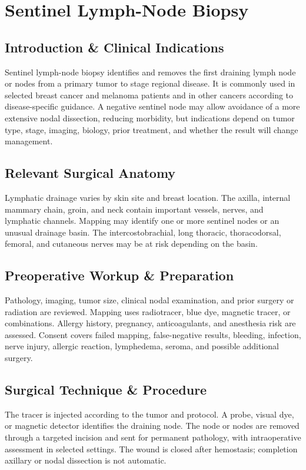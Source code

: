 \chapter{Sentinel Lymph-Node Biopsy}

\section*{Introduction \& Clinical Indications}
Sentinel lymph-node biopsy identifies and removes the first draining lymph node or nodes from a primary tumor to stage regional disease. It is commonly used in selected breast cancer and melanoma patients and in other cancers according to disease-specific guidance. A negative sentinel node may allow avoidance of a more extensive nodal dissection, reducing morbidity, but indications depend on tumor type, stage, imaging, biology, prior treatment, and whether the result will change management.

\section*{Relevant Surgical Anatomy}
Lymphatic drainage varies by skin site and breast location. The axilla, internal mammary chain, groin, and neck contain important vessels, nerves, and lymphatic channels. Mapping may identify one or more sentinel nodes or an unusual drainage basin. The intercostobrachial, long thoracic, thoracodorsal, femoral, and cutaneous nerves may be at risk depending on the basin.

\section*{Preoperative Workup \& Preparation}
Pathology, imaging, tumor size, clinical nodal examination, and prior surgery or radiation are reviewed. Mapping uses radiotracer, blue dye, magnetic tracer, or combinations. Allergy history, pregnancy, anticoagulants, and anesthesia risk are assessed. Consent covers failed mapping, false-negative results, bleeding, infection, nerve injury, allergic reaction, lymphedema, seroma, and possible additional surgery.

\section*{Surgical Technique \& Procedure}
The tracer is injected according to the tumor and protocol. A probe, visual dye, or magnetic detector identifies the draining node. The node or nodes are removed through a targeted incision and sent for permanent pathology, with intraoperative assessment in selected settings. The wound is closed after hemostasis; completion axillary or nodal dissection is not automatic.

